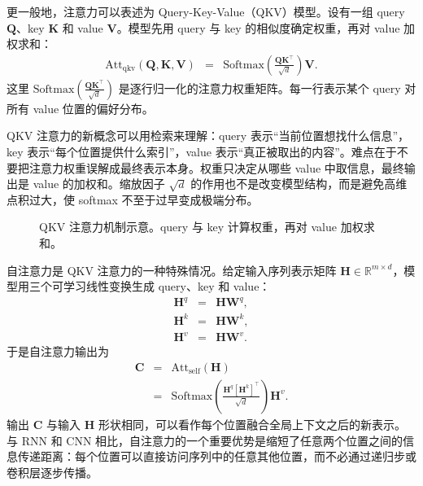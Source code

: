 更一般地，注意力可以表述为 Query-Key-Value（QKV）模型。设有一组 query $\mathbf{Q}$、key $\mathbf{K}$ 和 value $\mathbf{V}$。模型先用 query 与 key 的相似度确定权重，再对 value 加权求和：
\begin{eqnarray}
\mathrm{Att}_{\mathrm{qkv}}(\mathbf{Q},\mathbf{K},\mathbf{V})
& = &
\mathrm{Softmax}
\left(
\frac{\mathbf{Q}\mathbf{K}^{\top}}{\sqrt{d}}
\right)
\mathbf{V}.
\end{eqnarray}
这里 $\mathrm{Softmax}(\frac{\mathbf{Q}\mathbf{K}^{\top}}{\sqrt{d}})$ 是逐行归一化的注意力权重矩阵。每一行表示某个 query 对所有 value 位置的偏好分布。

\begin{importantnote}
  QKV 注意力的新概念可以用检索来理解：query 表示“当前位置想找什么信息”，key 表示“每个位置提供什么索引”，value 表示“真正被取出的内容”。难点在于不要把注意力权重误解成最终表示本身。权重只决定从哪些 value 中取信息，最终输出是 value 的加权和。缩放因子 $\sqrt{d}$ 的作用也不是改变模型结构，而是避免高维点积过大，使 softmax 不至于过早变成极端分布。
\end{importantnote}

\begin{figure}[htbp]
  \centering
  
  \caption{QKV 注意力机制示意。query 与 key 计算权重，再对 value 加权求和。}
  \label{fig:nlpbook-qkv-attention}
\end{figure}

自注意力是 QKV 注意力的一种特殊情况。给定输入序列表示矩阵 $\mathbf{H}\in\mathbb{R}^{m\times d}$，模型用三个可学习线性变换生成 query、key 和 value：
\begin{eqnarray}
\mathbf{H}^{q} &=& \mathbf{H}\mathbf{W}^{q},\\
\mathbf{H}^{k} &=& \mathbf{H}\mathbf{W}^{k},\\
\mathbf{H}^{v} &=& \mathbf{H}\mathbf{W}^{v}.
\end{eqnarray}
于是自注意力输出为
\begin{eqnarray}
\mathbf{C}
& = &
\mathrm{Att}_{\mathrm{self}}(\mathbf{H}) \nonumber \\
& = &
\mathrm{Softmax}
\left(
\frac{\mathbf{H}^{q}[\mathbf{H}^{k}]^{\top}}{\sqrt{d}}
\right)
\mathbf{H}^{v}.
\end{eqnarray}
输出 $\mathbf{C}$ 与输入 $\mathbf{H}$ 形状相同，可以看作每个位置融合全局上下文之后的新表示。与 RNN 和 CNN 相比，自注意力的一个重要优势是缩短了任意两个位置之间的信息传递距离：每个位置可以直接访问序列中的任意其他位置，而不必通过递归步或卷积层逐步传播。

